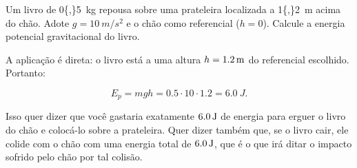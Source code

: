 \vspace{0.3cm}

\begin{exemplo}[Nível I]\label{exemplo_energia_potencialgravitacionalex01}

Um livro de \SI{0{,}5}{kg} repousa sobre uma prateleira localizada a
\SI{1{,}2}{m} acima do chão. Adote $g = \SI{10}{m/s^2}$ e o chão como
referencial ($h = 0$). Calcule a energia potencial
gravitacional do livro.


\resolucao

A aplicação é direta: o livro está a uma altura
$h = \SI{1{,}2}{m}$ do referencial escolhido. Portanto:

\[
  E_p = mgh = 0.5 \cdot 10 \cdot 1.2 = \SI{6.0}{J}.
\]

Isso quer dizer que você gastaria exatamente $\SI{6{,}0}{J}$ de energia para erguer o livro do chão e colocá-lo sobre a prateleira. Quer dizer também que, se o livro cair, ele colide com o chão com uma energia total de $\SI{6{,}0}{J}$, que é o que irá ditar o impacto sofrido pelo chão por tal colisão.

\end{exemplo}

\vspace{0.3cm}





